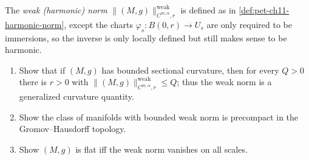 \begin{remark}[Exercise 11.6.15]
  \label{rem:pet-ch11-exercise-11-6-15}
  The \emph{weak (harmonic) norm} $\|(M,g)\|^{\mathrm{weak}}_{C^{m,\alpha},r}$
  is defined as in \cref{def:pet-ch11-harmonic-norm}, except the charts
  $\varphi_s:B(0,r)\to U_s$ are only required to be immersions, so the
  inverse is only locally defined but still makes sense to be harmonic.
  \begin{enumerate}
  \item Show that if $(M,g)$ has bounded sectional curvature, then for every
    $Q>0$ there is $r>0$ with $\|(M,g)\|^{\mathrm{weak}}_{C^{m,\alpha},r}\le Q$;
    thus the weak norm is a generalized curvature quantity.
  \item Show the class of manifolds with bounded weak norm is precompact in
    the Gromov--Hausdorff topology.
  \item Show $(M,g)$ is flat iff the weak norm vanishes on all scales.
  \end{enumerate}
\end{remark}
